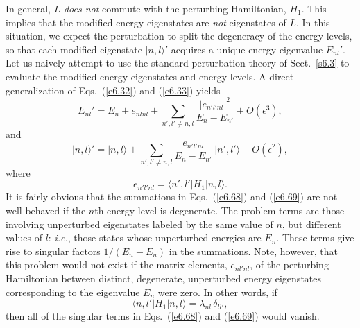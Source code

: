 In general, $L$ {\em does not}\/ commute with the perturbing Hamiltonian, $H_1$.
This implies that the modified energy eigenstates are {\em not}\/ eigenstates
of $L$. In this situation, we expect the perturbation to split the degeneracy
of the energy levels, so that each modified eigenstate $|n,l\rangle'$ acquires
a unique energy eigenvalue $E_{nl}'$. Let us naively attempt to use the standard
perturbation theory of Sect.~\ref{s6.3} to evaluate the modified 
energy eigenstates
and energy levels. A direct generalization of Eqs.~(\ref{e6.32}) and (\ref{e6.33}) yields
\begin{equation}\label{e6.68}
E_{nl}' = E_n + e_{nlnl} + \sum_{n', l' \neq n,l}
\frac{|e_{n'l'nl}|^2}{E_n - E_{n'}} + O(\epsilon^3),
\end{equation}
and
\begin{equation}\label{e6.69}
|n, l\rangle' = |n,l\rangle + \sum_{n', l'\neq n, l}
\frac{e_{n'l'nl}}{E_n-E_{n'}}\,|n',l'\rangle + O(\epsilon^2),
\end{equation}
where 
\begin{equation}
e_{n'l'nl} = \langle n',l'|H_1|n,l\rangle.
\end{equation}
It is fairly obvious that the summations in Eqs.~(\ref{e6.68}) and (\ref{e6.69}) are not
well-behaved if the $n$th energy level is degenerate. The problem terms
are those involving unperturbed eigenstates labeled by the same value of $n$, but different
values of $l$: {\em i.e.}, those states whose unperturbed energies are $E_n$.  These
terms give rise to singular factors $1/(E_n - E_n)$ in the summations. 
Note, however, that this problem would not exist if the matrix
elements, $e_{nl'nl}$, of the perturbing Hamiltonian between distinct, 
degenerate, unperturbed energy eigenstates 
corresponding to the eigenvalue $E_n$ were zero. In other words, if
\begin{equation}\label{e6.71}
\langle n, l' |H_1| n, l\rangle = \lambda_{nl}\, \delta_{ll'},
\end{equation}
then all of the singular terms in Eqs.~(\ref{e6.68}) and (\ref{e6.69}) would vanish. 

